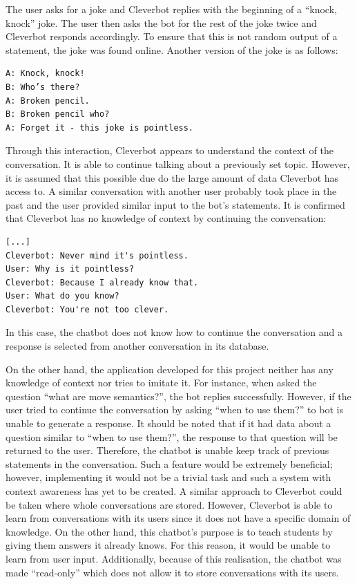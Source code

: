 \documentclass[12pt,a4paper]{article}
\begin{document}
The user asks for a joke and Cleverbot replies with the beginning of a “knock, knock” joke. The user then asks the bot for the rest of the joke twice and Cleverbot responds accordingly. To ensure that this is not random output of a statement, the joke was found online. Another version of the joke is as follows:

\begin{verbatim}
A: Knock, knock!
B: Who’s there?
A: Broken pencil.
B: Broken pencil who?
A: Forget it - this joke is pointless. 
\end{verbatim}

Through this interaction, Cleverbot appears to understand the context of the conversation. It is able to continue talking about a previously set topic. However, it is assumed that this possible due do the large amount of data Cleverbot has access to. A similar conversation with another user probably took place in the past and the user provided similar input to the bot’s statements. It is confirmed that Cleverbot has no knowledge of context by continuing the conversation:

\begin{verbatim}
[...]
Cleverbot: Never mind it's pointless.
User: Why is it pointless?
Cleverbot: Because I already know that.
User: What do you know?
Cleverbot: You're not too clever.
\end{verbatim}

In this case, the chatbot does not know how to continue the conversation and a response is selected from another conversation in its database.

On the other hand, the application developed for this project neither has any knowledge of context nor tries to imitate it. For instance, when asked the question \enquote{what are move semantics?}, the bot replies successfully. However, if the user tried to continue the conversation by asking “when to use them?” to bot is unable to generate a response. It should be noted that if it had data about a question similar to \enquote{when to use them?}, the response to that question will be returned to the user. Therefore, the chatbot is unable keep track of previous statements in the conversation. Such a feature would be extremely beneficial; however, implementing it would not be a trivial task and such a system with context awareness has yet to be created. A similar approach to Cleverbot could be taken where whole conversations are stored. However, Cleverbot is able to learn from conversations with its users since it does not have a specific domain of knowledge. On the other hand, this chatbot’s purpose is to teach students by giving them answers it already knows. For this reason, it would be unable to learn from user input. Additionally, because of this realisation, the chatbot was made \enquote{read-only} which does not allow it to store conversations with its users.
\end{document}
